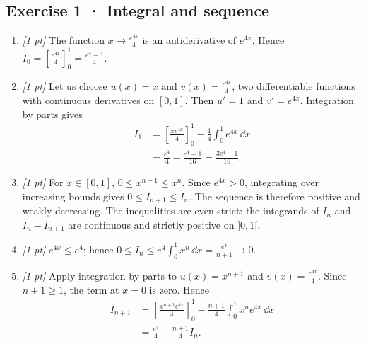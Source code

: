 \subsection*{Exercise 1 · Integral and sequence}\begin{enumerate}

\item \textit{[1 pt]} The function $x\mapsto \frac{e^{4x}}{4}$ is an antiderivative of $e^{4x}$. Hence $I_0=[\frac{e^{4x}}{4}]_0^1=\frac{e^{4}-1}{4}$.

\item \textit{[1 pt]} Let us choose $u(x)=x$ and $v(x)=\frac{e^{4x}}{4}$, two differentiable functions with continuous derivatives on $[0,1]$. Then $u'=1$ and $v'=e^{4x}$. Integration by parts gives
\[\begin{aligned}I_1&=\left[\frac{xe^{4x}}{4}\right]_0^1-\frac{1}{4}\int_0^1e^{4x}\,\dd x\\&=\frac{e^{4}}{4}-\frac{e^{4}-1}{16}=\frac{3e^{4}+1}{16}.\end{aligned}\]

\item \textit{[1 pt]} For $x\in[0,1]$, $0\le x^{n+1}\le x^n$. Since $e^{4x}>0$, integrating over increasing bounds gives $0\le I_{n+1}\le I_n$. The sequence is therefore positive and weakly decreasing. The inequalities are even strict: the integrands of $I_n$ and $I_n-I_{n+1}$ are continuous and strictly positive on $]0,1[$.

\item \textit{[1 pt]} $e^{4x}\le e^{4}$; hence $0\le I_n\le e^{4}\int_0^1x^n\,\dd x=\frac{e^{4}}{n+1}\to0$.

\item \textit{[1 pt]} Apply integration by parts to $u(x)=x^{n+1}$ and $v(x)=\frac{e^{4x}}{4}$. Since $n+1\ge1$, the term at $x=0$ is zero. Hence
\[\begin{aligned}I_{n+1}&=\left[\frac{x^{n+1}e^{4x}}{4}\right]_0^1-\frac{n+1}{4}\int_0^1x^ne^{4x}\,\dd x\\&=\frac{e^{4}}{4}-\frac{n+1}{4}I_n.\end{aligned}\]

\end{enumerate}

